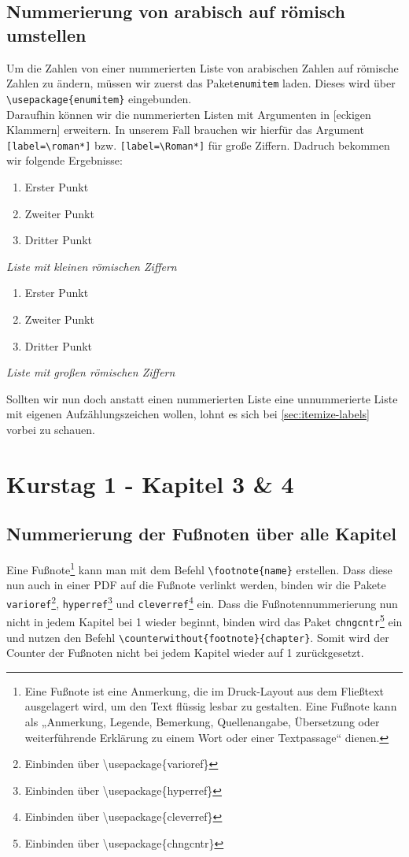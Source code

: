 \documentclass[
12pt,
ngerman
]{scrreprt}
\begin{document}
\section{Nummerierung von arabisch auf römisch umstellen}
\label{sec:enum-label}
Um die Zahlen von einer nummerierten Liste von arabischen Zahlen auf römische Zahlen zu ändern, müssen wir zuerst das Paket\verb!enumitem! laden. Dieses wird über \verb!\usepackage{enumitem}! eingebunden. \\
Daraufhin können wir die nummerierten Listen mit Argumenten in [eckigen Klammern] erweitern. In unserem Fall brauchen wir hierfür das Argument \verb![label=\roman*]! bzw. \verb![label=\Roman*]! für große Ziffern. Dadruch bekommen wir folgende Ergebnisse:
\begin{multicols}{2}
  \begin{enumerate}[label=\roman*]
    \item Erster Punkt
    \item Zweiter Punkt
    \item Dritter Punkt
  \end{enumerate}
  \emph{Liste mit kleinen römischen Ziffern}
  \begin{enumerate}[label=\Roman*]
    \item Erster Punkt
    \item Zweiter Punkt
    \item Dritter Punkt
  \end{enumerate}
  \emph{Liste mit großen römischen Ziffern}
\end{multicols}
Sollten wir nun doch anstatt einen nummerierten Liste eine unnummerierte Liste mit eigenen Aufzählungszeichen wollen, lohnt es sich bei \cref{sec:itemize-labels} vorbei zu schauen.

\chapter{Kurstag 1 - Kapitel 3 \& 4}
\label{cha:chap3-4}
\label{blatt:2}

\section{Nummerierung der Fußnoten über alle Kapitel}
\label{sec:footnotes}
Eine Fußnote\footnote{Eine Fußnote ist eine Anmerkung, die im Druck-Layout aus dem Fließtext ausgelagert wird, um den Text flüssig lesbar zu gestalten. Eine Fußnote kann als „Anmerkung, Legende, Bemerkung, Quellenangabe, Übersetzung oder weiterführende Erklärung zu einem Wort oder einer Textpassage“ dienen.} kann man mit dem Befehl \verb!\footnote{name}! erstellen. Dass diese nun auch in einer PDF auf die Fußnote verlinkt werden, binden wir die Pakete \verb!varioref!\footnote{Einbinden über \textbackslash usepackage\{varioref\}}, \verb!hyperref!\footnote{Einbinden über \textbackslash usepackage\{hyperref\}} und \verb!cleverref!\footnote{Einbinden über \textbackslash usepackage\{cleverref\}} ein. Dass die Fußnotennummerierung nun nicht in jedem Kapitel bei 1 wieder beginnt, binden wird das Paket \verb!chngcntr!\footnote{Einbinden über \textbackslash usepackage\{chngcntr\}} ein und nutzen den Befehl \verb!\counterwithout{footnote}{chapter}!. Somit wird der Counter der Fußnoten nicht bei jedem Kapitel wieder auf 1 zurückgesetzt.
\end{document}
